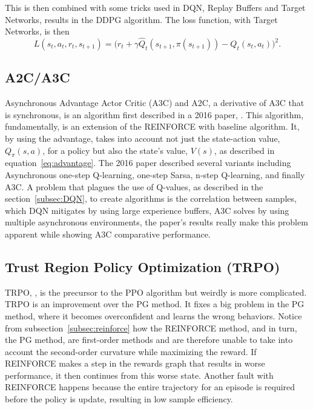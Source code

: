 This is then combined with some tricks used in DQN, Replay Buffers and Target Networks, results in the DDPG algorithm. The loss function, with Target Networks, is then $$L(s_t, a_t, r_t, s_{t+1})=\big(r_t+\gamma \hat{Q}_t(s_{t+1},\pi(s_{t+1}))-Q_t(s_t,a_t)\big)^2.$$

\subsection{A2C/A3C}

Asynchronous Advantage Actor Critic (A3C) and A2C, a derivative of A3C that is synchronous, is an algorithm first described in a 2016 paper, \cite{mnih_badia_mirza_graves_harley_lillicrap_silver_kavukcuoglu_2016}. This algorithm, fundamentally, is an extension of the REINFORCE with baseline algorithm. It, by using the advantage, takes into account not just the state-action value, $Q_\pi (s, a)$, for a policy but also the state's value, $V(s)$, as described in equation~\ref{eq:advantage}. The 2016 paper described several variants including Asynchronous one-step Q-learning, one-step Sarsa, n-step Q-learning, and finally A3C. A problem that plagues the use of Q-values, as described in the section~\ref{subsec:DQN}, to create algorithms is the correlation between samples, which DQN mitigates by using large experience buffers, A3C solves by using multiple asynchronous environments, the paper's results really make this problem apparent while showing A3C comparative performance.

\subsection{Trust Region Policy Optimization (TRPO)}

TRPO, \cite{schulman_levine_mortiz_jordan_abbeel_2015}, is the precursor to the PPO algorithm but weirdly is more complicated. TRPO is an improvement over the PG method. It fixes a big problem in the PG method, where it becomes overconfident and learns the wrong behaviors. Notice from subsection~\ref{subsec:reinforce} how the REINFORCE method, and in turn, the PG method, are first-order methods and are therefore unable to take into account the second-order curvature while maximizing the reward. If REINFORCE makes a step in the rewards graph that results in worse performance, it then continues from this worse state. Another fault with REINFORCE happens because the entire trajectory for an episode is required before the policy is update, resulting in low sample efficiency. 

